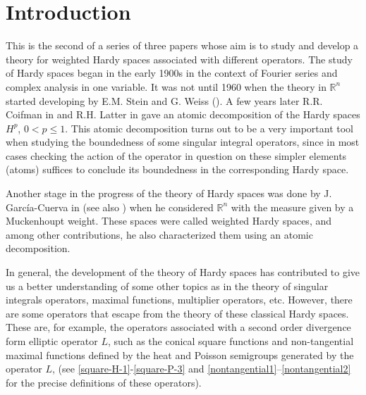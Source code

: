 \documentclass[11pt, a4paper,leqno]{amsart}
\theoremstyle{plain}
\theoremstyle{definition}
\theoremstyle{remark}
\numberwithin{equation}{section}
\def \R{ \mathbb{R} }
\begin{document}
\maketitle


\tableofcontents







\bigskip
\section{Introduction}
This is the second of a series of three papers whose aim is to study and develop a theory for weighted Hardy spaces associated with different operators. 
The study of Hardy spaces began in the early 1900s in the context of Fourier series and complex analysis in one variable. It was not until 1960 when the theory in $\R^n$ started developing by
E.M. Stein and G. Weiss (\cite{SteinWeiss}). A few years later R.R. Coifman in \cite{Coifman} and R.H. Latter in \cite{Latter} gave an atomic decomposition of the Hardy spaces $H^p$, $0<p\leq 1$. This atomic decomposition turns out to be a very important tool when studying the boundedness of some singular integral operators, since
in most cases checking the action of the operator in question on these simpler elements (atoms) suffices to conclude its boundedness in the corresponding Hardy space.

Another stage in the progress of the theory of Hardy spaces was done by J. Garc\'ia-Cuerva in \cite{GarciaCuerva} (see also \cite{StrombergTorchinsky}) when he considered $\R^n$ with the measure given by a Muckenhoupt weight. These spaces were called weighted Hardy spaces, and among other contributions, he also characterized them using an atomic decomposition.

In general, the development of the theory of Hardy spaces has contributed to give us a better understanding of some other topics as in the theory of singular integrals operators, maximal functions, multiplier operators, etc. However, there are some operators that escape from the theory of these classical Hardy spaces. These are, for example, the operators associated with a second order divergence form elliptic operator $L$, such as 
the conical square functions and non-tangential maximal functions defined by the heat and Poisson  semigroups generated by the operator $L$, (see \eqref{square-H-1}-\eqref{square-P-3} and \eqref{nontangential1}--\eqref{nontangential2} for the precise definitions of these operators).
\end{document}
